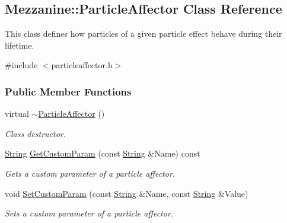 \hypertarget{classMezzanine_1_1ParticleAffector}{
\subsection{Mezzanine::ParticleAffector Class Reference}
\label{classMezzanine_1_1ParticleAffector}
}


This class defines how particles of a given particle effect behave during their lifetime.  




{\ttfamily \#include $<$particleaffector.h$>$}

\subsubsection*{Public Member Functions}
\begin{DoxyCompactItemize}
\item 
\hypertarget{classMezzanine_1_1ParticleAffector_a86c8ed14bb0b264f729988feeef3fb77}{
virtual \hyperlink{classMezzanine_1_1ParticleAffector_a86c8ed14bb0b264f729988feeef3fb77}{$\sim$ParticleAffector} ()}
\label{classMezzanine_1_1ParticleAffector_a86c8ed14bb0b264f729988feeef3fb77}

\begin{DoxyCompactList}\small\item\em Class destructor. \item\end{DoxyCompactList}\item 
\hyperlink{namespaceMezzanine_acf9fcc130e6ebf08e3d8491aebcf1c86}{String} \hyperlink{classMezzanine_1_1ParticleAffector_a2240b3dd59a656c63407cd8a719824b8}{GetCustomParam} (const \hyperlink{namespaceMezzanine_acf9fcc130e6ebf08e3d8491aebcf1c86}{String} \&Name) const 
\begin{DoxyCompactList}\small\item\em Gets a custom parameter of a particle affector. \item\end{DoxyCompactList}\item 
void \hyperlink{classMezzanine_1_1ParticleAffector_a0467b8c51e34cf7f2e71189fa60a3716}{SetCustomParam} (const \hyperlink{namespaceMezzanine_acf9fcc130e6ebf08e3d8491aebcf1c86}{String} \&Name, const \hyperlink{namespaceMezzanine_acf9fcc130e6ebf08e3d8491aebcf1c86}{String} \&Value)
\begin{DoxyCompactList}\small\item\em Sets a custom parameter of a particle affector. \item\end{DoxyCompactList}\end{DoxyCompactItemize}
